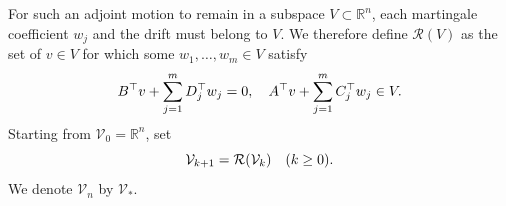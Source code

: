 \documentclass[twocolumn]{autart}
\begin{document}
For such an adjoint motion to remain in a subspace $V\subset\mathbb R^n$,
each martingale coefficient $w_j$ and the drift must belong to $V$.
We therefore define $\mathcal R(V)$ as the set of $v\in V$ for which
some $w_1,\dots,w_m\in V$ satisfy\vspace{-3mm}
\begin{equation}\label{eq:map}
B^{\top}v+\sum_{j=1}^mD_j^{\top}w_j =0,\quad
A^{\top}v+\sum_{j=1}^mC_j^{\top}w_j \in V. \vspace{-3mm}
\end{equation}
%
Starting from $\mathcal V_0=\mathbb R^n$, set\vspace{-3mm}
%
\begin{equation}\label{eq:flag}
\mathcal V_{k+1}=\mathcal R(\mathcal V_k)\quad(k\geq0).\vspace{-3mm}
\end{equation}
%
We denote $\mathcal V_n$ by $\mathcal V_*$.
\end{document}
